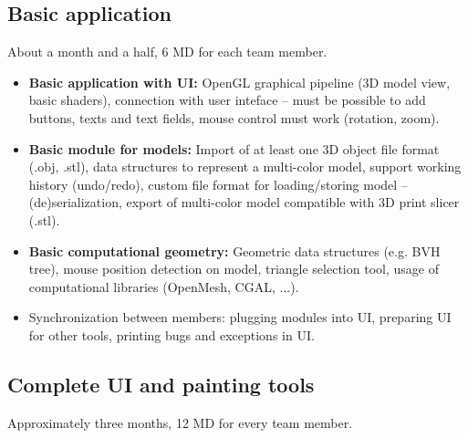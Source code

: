 \subsection{Basic application}

About a month and a half, 6 MD for each team member.

\begin{itemize}
\item \textbf{Basic application with UI:} OpenGL graphical pipeline (3D model view, basic shaders), connection with user inteface -- must be possible to add buttons, texts and text fields, mouse control must work (rotation, zoom).
\item \textbf{Basic module for models:} Import of at least one 3D object file format (.obj, .stl), data structures to represent a multi-color model, support working history (undo/redo), custom file format for loading/storing model -- (de)serialization, export of multi-color model compatible with 3D print slicer (.stl).
\item \textbf{Basic computational geometry:} Geometric data structures (e.g. BVH tree), mouse position detection on model, triangle selection tool, usage of computational libraries (OpenMesh, CGAL, ...).
\item Synchronization between members: plugging modules into UI, preparing UI for other tools, printing bugs and exceptions in UI.
\end{itemize}


\subsection{Complete UI and painting tools}

Approximately three months, 12 MD for every team member.

